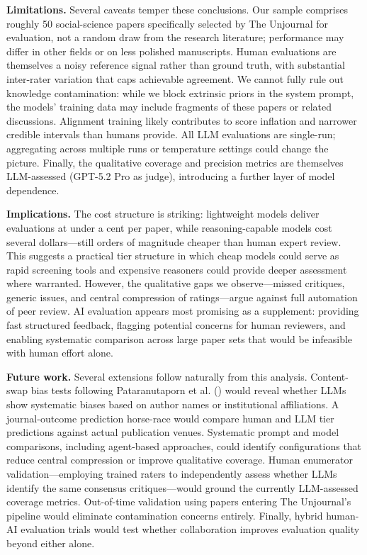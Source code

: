 \documentclass[
  11pt,
  letterpaper,
]{article}
\begin{document}
\textbf{Limitations.} Several caveats temper these conclusions. Our
sample comprises roughly 50 social-science papers specifically selected
by The Unjournal for evaluation, not a random draw from the research
literature; performance may differ in other fields or on less polished
manuscripts. Human evaluations are themselves a noisy reference signal
rather than ground truth, with substantial inter-rater variation that
caps achievable agreement. We cannot fully rule out knowledge
contamination: while we block extrinsic priors in the system prompt, the
models' training data may include fragments of these papers or related
discussions. Alignment training likely contributes to score inflation
and narrower credible intervals than humans provide. All LLM evaluations
are single-run; aggregating across multiple runs or temperature settings
could change the picture. Finally, the qualitative coverage and
precision metrics are themselves LLM-assessed (GPT-5.2 Pro as judge),
introducing a further layer of model dependence.

\textbf{Implications.} The cost structure is striking: lightweight
models deliver evaluations at under a cent per paper, while
reasoning-capable models cost several dollars---still orders of
magnitude cheaper than human expert review. This suggests a practical
tier structure in which cheap models could serve as rapid screening
tools and expensive reasoners could provide deeper assessment where
warranted. However, the qualitative gaps we observe---missed critiques,
generic issues, and central compression of ratings---argue against full
automation of peer review. AI evaluation appears most promising as a
supplement: providing fast structured feedback, flagging potential
concerns for human reviewers, and enabling systematic comparison across
large paper sets that would be infeasible with human effort alone.

\textbf{Future work.} Several extensions follow naturally from this
analysis. Content-swap bias tests following Pataranutaporn et al.
() would reveal whether LLMs show
systematic biases based on author names or institutional affiliations. A
journal-outcome prediction horse-race would compare human and LLM tier
predictions against actual publication venues. Systematic prompt and
model comparisons, including agent-based approaches, could identify
configurations that reduce central compression or improve qualitative
coverage. Human enumerator validation---employing trained raters to
independently assess whether LLMs identify the same consensus
critiques---would ground the currently LLM-assessed coverage metrics.
Out-of-time validation using papers entering The Unjournal's pipeline
would eliminate contamination concerns entirely. Finally, hybrid
human-AI evaluation trials would test whether collaboration improves
evaluation quality beyond either alone.
\end{document}
